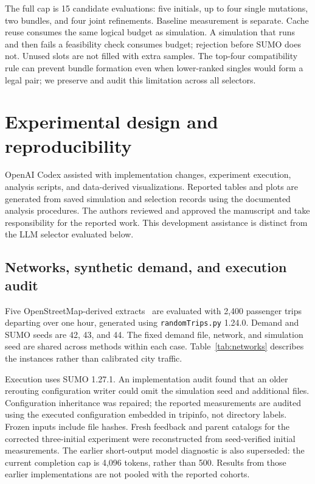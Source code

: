 \documentclass[11pt]{article}
\begin{document}
The full cap is 15 candidate evaluations: five initials, up to four single mutations, two bundles, and four joint refinements. Baseline measurement is separate. Cache reuse consumes the same logical budget as simulation. A simulation that runs and then fails a feasibility check consumes budget; rejection before SUMO does not. Unused slots are not filled with extra samples. The top-four compatibility rule can prevent bundle formation even when lower-ranked singles would form a legal pair; we preserve and audit this limitation across all selectors.

\section{Experimental design and reproducibility}\label{sec:design}
OpenAI Codex assisted with implementation changes, experiment execution, analysis scripts, and data-derived visualizations. Reported tables and plots are generated from saved simulation and selection records using the documented analysis procedures. The authors reviewed and approved the manuscript and take responsibility for the reported work. This development assistance is distinct from the LLM selector evaluated below.

\subsection{Networks, synthetic demand, and execution audit}\label{sec:demand}
Five OpenStreetMap-derived extracts~\cite{openstreetmap} are evaluated with 2,400 passenger trips departing over one hour, generated using \texttt{randomTrips.py} 1.24.0. Demand and SUMO seeds are 42, 43, and 44. The fixed demand file, network, and simulation seed are shared across methods within each case. Table~\ref{tab:networks} describes the instances rather than calibrated city traffic.

\begin{table}[htbp]\centering\small
\caption{Network inventory and baseline mean trip time loss (mean $\pm$ sample SD over three seeds). Junction totals include internal records.}\label{tab:networks}

\end{table}

Execution uses SUMO 1.27.1. An implementation audit found that an older rerouting configuration writer could omit the simulation seed and additional files. Configuration inheritance was repaired; the reported measurements are audited using the executed configuration embedded in tripinfo, not directory labels. Frozen inputs include file hashes. Fresh feedback and parent catalogs for the corrected three-initial experiment were reconstructed from seed-verified initial measurements. The earlier short-output model diagnostic is also superseded: the current completion cap is 4,096 tokens, rather than 500. Results from those earlier implementations are not pooled with the reported cohorts.
\end{document}
